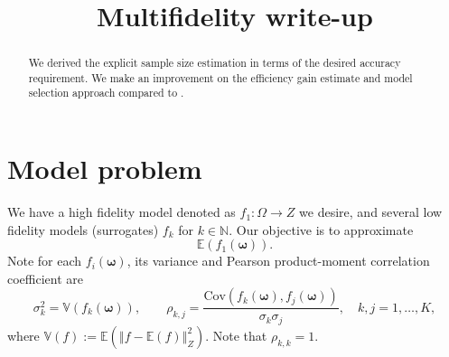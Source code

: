 \documentclass[final,3p,times,11pt]{elsarticle}
\begin{document}
\begin{frontmatter}
\title{Multifidelity write-up}
\begin{abstract}
We derived the explicit sample size estimation in terms of the desired accuracy requirement. We make an improvement on the efficiency gain estimate and model selection approach compared to \cite{PeWiGu:2016}.
\end{abstract}
\end{frontmatter}



\section{Model problem}\label{sec:Problem_setup}
We have a high fidelity model denoted as $f_1: \Omega \rightarrow Z$ we desire, and several low fidelity models (surrogates) $f_k$ for $k\in \mathbb{N}$. Our objective is to approximate 
\[
\mathbb{E}\left(f_1(\boldsymbol{\omega})\right).
\]
Note for each $f_i(\boldsymbol{\omega})$, its variance and Pearson product-moment correlation coefficient are 
\begin{equation*}
    \sigma_k^2 = \mathbb{V}\left(f_k(\boldsymbol{\omega})\right),\qquad \rho_{k,j} = \frac{\text{Cov}\left(f_k(\boldsymbol{\omega}),f_j(\boldsymbol{\omega})\right)}{\sigma_k\sigma_j}, \quad k,j=1,\dots, K,
\end{equation*}
where $\mathbb{V}(f) := \mathbb{E}\left(\left\Vert f - \mathbb{E}(f)\right\Vert_Z^2\right)$. Note that $\rho_{k,k}=1$.
\end{document}

